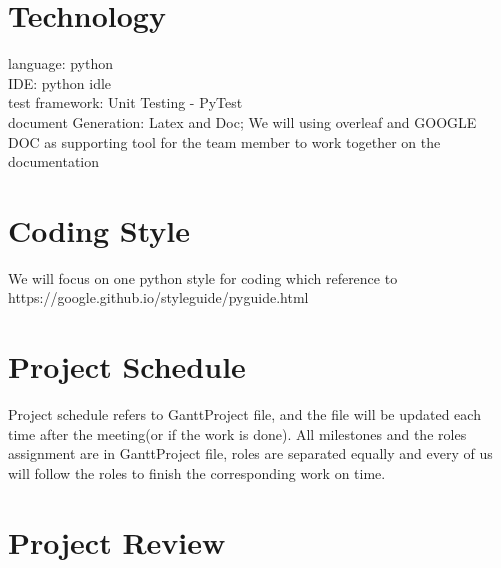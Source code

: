 \documentclass[10pt]{article}
\begin{document}
\newpage

\section{Technology}
    language: python
	\\IDE: python idle
	\\test framework: Unit Testing - PyTest
	\\document Generation: Latex and Doc; We will using overleaf and GOOGLE DOC as supporting tool for the team member to work together on the documentation

\newpage

\section{Coding Style}
We will focus on one python style for coding which reference to\\ https://google.github.io/styleguide/pyguide.html
\newpage

\section{Project Schedule}
Project schedule refers to GanttProject file, and the file will be updated each time after the meeting(or if the work is done). All milestones and the roles assignment are in GanttProject file, roles are separated equally and every of us will follow the roles to finish the corresponding work on time.

\newpage

\section{Project Review}
\end{document}
